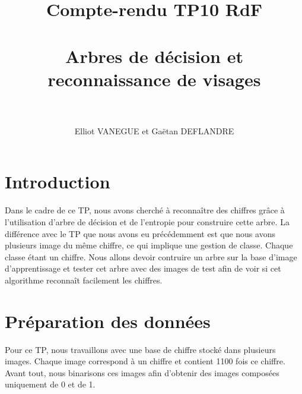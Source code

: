 \documentclass[a4paper,11pt]{article}
\title{Compte-rendu TP10 RdF\\ \ \\\textbf{Arbres de décision et reconnaissance de visages}\\ \ \\}
\author{Elliot VANEGUE et Gaëtan DEFLANDRE}
\begin{document}
  
  
  
  \maketitle
  
  \mbox{}
  \newpage
  \clearpage
  
  \section{Introduction}
  Dans le cadre de ce TP, nous avons cherché à reconnaître des chiffres grâce à l'utilisation d'arbre
  de décision et de l'entropie pour construire cette arbre. La différence avec le TP que nous avons eu précédemment est que nous avons 
  plusieurs image du même chiffre, ce qui implique une gestion de classe. Chaque classe étant
  un chiffre. Nous allons devoir contruire un arbre sur la base d'image d'apprentissage et tester
  cet arbre avec des images de test afin de voir si cet algorithme reconnaît facilement les chiffres.\\
  
  \section{Préparation des données}
  Pour ce TP, nous travaillons avec une base de chiffre stocké dans plusieurs images. 
  Chaque image correspond à un chiffre et contient 1100 fois ce chiffre. Avant tout, 
  nous binarisons ces images afin d'obtenir des images composées uniquement de 0 et de 1.\\
  
\end{document}
